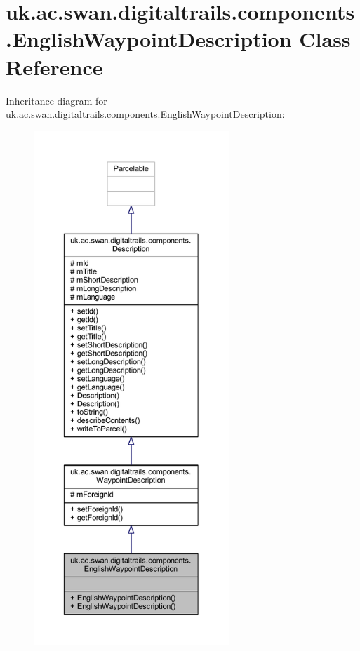 \hypertarget{classuk_1_1ac_1_1swan_1_1digitaltrails_1_1components_1_1_english_waypoint_description}{\section{uk.\+ac.\+swan.\+digitaltrails.\+components.\+English\+Waypoint\+Description Class Reference}
\label{classuk_1_1ac_1_1swan_1_1digitaltrails_1_1components_1_1_english_waypoint_description}
}


Inheritance diagram for uk.\+ac.\+swan.\+digitaltrails.\+components.\+English\+Waypoint\+Description\+:
\nopagebreak
\begin{figure}[H]
\begin{center}
\leavevmode
\includegraphics[height=550pt]{classuk_1_1ac_1_1swan_1_1digitaltrails_1_1components_1_1_english_waypoint_description__inherit__graph}
\end{center}
\end{figure}


